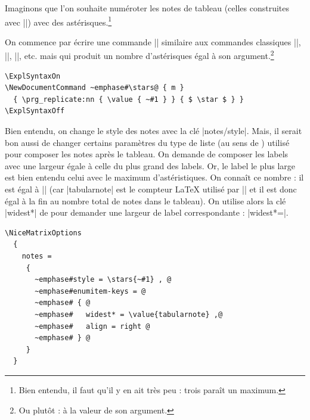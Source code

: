 \documentclass[dvipsnames]{article}%
\begin{document}
\medskip
Imaginons que l'on souhaite numéroter les notes de tableau (celles construites
avec |\tabularnote|) avec des astérisques.\footnote{Bien entendu, il faut qu'il
  y en ait très peu : trois paraît un maximum.}

On commence par écrire une commande |\stars| similaire aux commandes classiques
|\arabic|, |\alph|, |\Alph|, etc. mais qui produit un nombre d'astérisques égal
à son argument.\footnote{Ou plutôt : à la valeur de son argument.}
\begin{Verbatim}
\ExplSyntaxOn
\NewDocumentCommand ~emphase#\stars@ { m }
  { \prg_replicate:nn { \value { ~#1 } } { $ \star $ } }
\ExplSyntaxOff
\end{Verbatim}
%
Bien entendu, on change le style des notes avec la clé |notes/style|. Mais, il
serait bon aussi de changer certains paramètres du type de liste (au sens de
) utilisé pour composer les notes après le tableau. On demande de
composer les labels avec une largeur égale à celle du plus grand des labels. Or,
le label le plus large est bien entendu celui avec le maximum d'astéristiques.
On connaît ce nombre : il est égal à |\value{tabularnote}| (car |tabularnote|
est le compteur LaTeX utilisé par |\tabularnote| et il est donc égal à la fin au
nombre total de notes dans le tableau). On utilise alors la clé |widest*| de
 pour demander une largeur de label correspondante :
|widest*=\value{tabularnote}|.
\begin{Verbatim}
\NiceMatrixOptions
  {
    notes =
     {
       ~emphase#style = \stars{~#1} , @
       ~emphase#enumitem-keys = @
       ~emphase# { @
       ~emphase#   widest* = \value{tabularnote} ,@
       ~emphase#   align = right @
       ~emphase# } @
     }
  }
\end{Verbatim}
\end{document}
